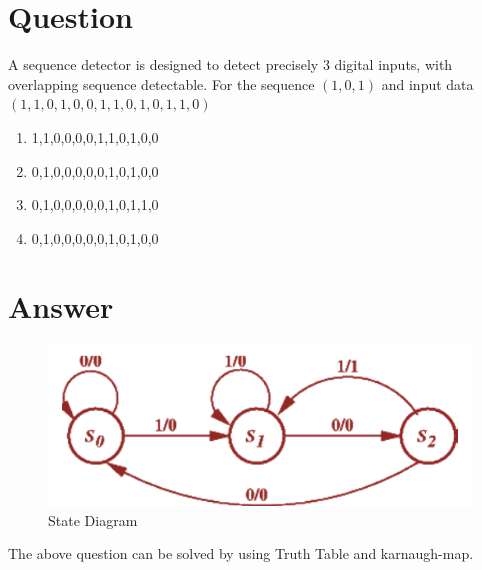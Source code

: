 \documentclass[journal,12pt,twocolumn]{IEEEtran}
\title{\ktitle}
\author{\kauthor\\\kcontact\\\kmodule}
\begin{document}
\maketitle
\tableofcontents
\section{\textbf{Question}}
A sequence detector is designed to detect precisely 3 digital inputs, with overlapping sequence detectable. For the sequence $(1,0,1)$ and input data $(1,1,0,1,0,0,1,1,0,1,0,1,1,0)$ 
\begin{enumerate}
    \item 1,1,0,0,0,0,1,1,0,1,0,0
    \item 0,1,0,0,0,0,0,1,0,1,0,0
    \item 0,1,0,0,0,0,0,1,0,1,1,0
    \item 0,1,0,0,0,0,0,1,0,1,0,0
\end{enumerate}

\section{\textbf{Answer}}
\begin{figure}[h!]
	\centering
	\includegraphics [width=\columnwidth] {figs/StateDiagram.png}
	\caption{State Diagram}
	\label{fig:fig1}
\end{figure}

The above question can be solved by using Truth Table and karnaugh-map.\\
\end{document}
